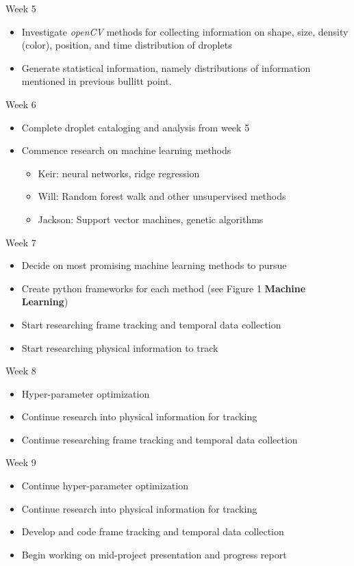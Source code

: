 \documentclass[12pt]{amsart}
\begin{document}
Week 5
\vspace*{-11pt}
\begin{itemize}
	\item Investigate \textit{openCV} methods for collecting information on shape, size, density (color), position, and time distribution of droplets
	\item Generate statistical information, namely distributions of information mentioned in previous bullitt point.
\end{itemize}

Week 6
\vspace*{-11pt}
\begin{itemize}
	\item Complete droplet cataloging and analysis from week 5
	\item Commence research on machine learning methods
	\begin{itemize}
		\item Keir: neural networks, ridge regression
		\item Will: Random forest walk and other unsupervised methods
		\item Jackson: Support vector machines, genetic algorithms
	\end{itemize}
\end{itemize}

Week 7
\vspace*{-11pt}
\begin{itemize}
	\item Decide on most promising machine learning methods to pursue
	\item Create python frameworks for each method (see Figure 1 \textbf{Machine Learning})
	\item Start researching frame tracking and temporal data collection
	\item Start researching physical information to track 
\end{itemize}

Week 8
\vspace*{-11pt}
\begin{itemize}
	\item Hyper-parameter optimization
	\item Continue research into physical information for tracking
	\item Continue researching frame tracking and temporal data collection
\end{itemize}

Week 9
\vspace*{-11pt}
\begin{itemize}
	\item Continue hyper-parameter optimization
	\item Continue research into physical information for tracking
	\item Develop and code frame tracking and temporal data collection
	\item Begin working on mid-project presentation and progress report
\end{itemize}
\end{document}
